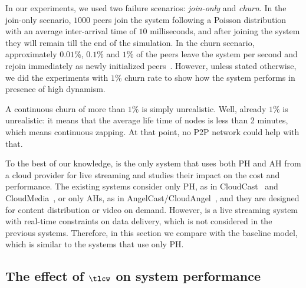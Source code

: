 In our experiments, we used two failure scenarios: {\em join-only} and {\em
churn}. In the join-only scenario, $1000$ peers join the system following a
Poisson distribution with an average inter-arrival time of $10$ milliseconds,
and after joining the system they will remain till the end of the simulation.
In the churn scenario, approximately $0.01$\%, $0.1$\% and $1$\% of the peers
leave the system per second and rejoin immediately as newly initialized
peers~\cite{churn}. However, unless stated otherwise, we did the experiments
with $1\%$ churn rate to show how the system performs in presence of high
dynamism. {A continuous churn of more than $1\%$ is simply unrealistic. Well, already $1\%$ is unrealistic: it means that the average life time of nodes is less than 2 minutes, which means continuous zapping. At that point, no P2P network could help with that.

To the best of our knowledge, \clive is the only system that uses both PH and AH from a cloud provider for live streaming and studies their impact on the cost and performance. The existing systems consider only PH, as in CloudCast~\cite{cloudcast} and CloudMedia~\cite{cloudmedia}, or only AHs, as in AngelCast/CloudAngel~\cite{angelcast}, and they are designed for content distribution or video on demand. However, \clive is a live streaming system with real-time constraints on data delivery, which is not considered in the previous systems. Therefore, in this section we compare \clive with the baseline model, which is similar to the systems that use only PH.

\subsection{The effect of $\tlcw$ on system performance}

}
